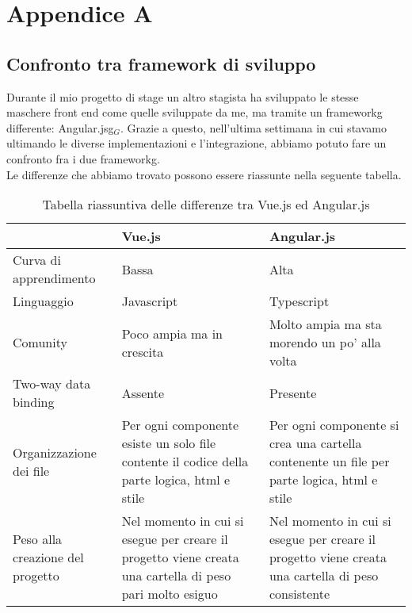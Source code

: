 
\chapter{Appendice A}

\section{Confronto tra framework di sviluppo}

Durante il mio progetto di stage un altro stagista ha sviluppato le stesse maschere front end come quelle sviluppate da me, ma tramite un \gls{frameworkg} differente: \gls{Angular.jsg}$_G$. Grazie a questo, nell'ultima settimana in cui stavamo ultimando le diverse implementazioni e l'integrazione, abbiamo potuto fare un confronto fra i due \gls{frameworkg}.\\
Le differenze che abbiamo trovato possono essere riassunte nella seguente tabella.

\begin{table}[H]
	\caption{Tabella riassuntiva delle differenze tra Vue.js ed Angular.js}
	\label{tab:confronto-framework}
	\renewcommand{\arraystretch}{1.6}
	\begin{tabularx}{\textwidth}{lX|X}
		\hline\hline
		\textbf{} & \textbf{Vue.js} & \textbf{Angular.js}\\
		\hline
		Curva di apprendimento & Bassa & Alta \\
		\hline
		Linguaggio & Javascript & Typescript \\
		\hline
		Comunity & Poco ampia ma in crescita & Molto ampia ma sta morendo un po' alla volta \\
		\hline
		Two-way data binding & Assente & Presente \\
		\hline
		Organizzazione dei file & Per ogni componente esiste un solo file contente il codice della parte logica, html e stile & Per ogni componente si crea una cartella contenente un file per parte logica, html e stile \\
		\hline
		Peso alla creazione del progetto & Nel momento in cui si esegue per creare il progetto viene creata una cartella di peso pari molto esiguo & Nel momento in cui si esegue per creare il progetto viene creata una cartella di peso consistente \\
		\hline
	\end{tabularx}
\end{table}%

